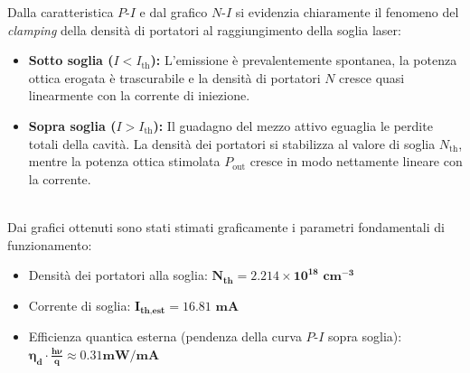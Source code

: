 \noindent Dalla caratteristica $P$-$I$ e dal grafico $N$-$I$ si evidenzia chiaramente il fenomeno del \textit{clamping} della densità di portatori al raggiungimento della soglia laser:
\begin{itemize}
    \item \textbf{Sotto soglia ($I < I_{\text{th}}$):} L'emissione è prevalentemente spontanea, la potenza ottica erogata è trascurabile e la densità di portatori $N$ cresce quasi linearmente con la corrente di iniezione.
    \item \textbf{Sopra soglia ($I > I_{\text{th}}$):} Il guadagno del mezzo attivo eguaglia le perdite totali della cavità. La densità dei portatori si stabilizza al valore di soglia $N_{\text{th}}$, mentre la potenza ottica stimolata $P_{\text{out}}$ cresce in modo nettamente lineare con la corrente.
\end{itemize}

\noindent\\ Dai grafici ottenuti sono stati stimati graficamente i parametri fondamentali di funzionamento:
\begin{itemize}
    \item Densità dei portatori alla soglia: $\boldsymbol{N_{\text{th}} = 2.214 \times 10^{18}\text{ cm}^{-3}}$
    \item Corrente di soglia: $\boldsymbol{I_{\text{th,est}} = 16.81\text{ mA}}$
    \item Efficienza quantica esterna (pendenza della curva $P$-$I$ sopra soglia): $\boldsymbol{\eta_{d}\cdot \frac{h\nu}{q} \approx 0.31 \text{mW/mA}}$
\end{itemize}

\noindent\\
